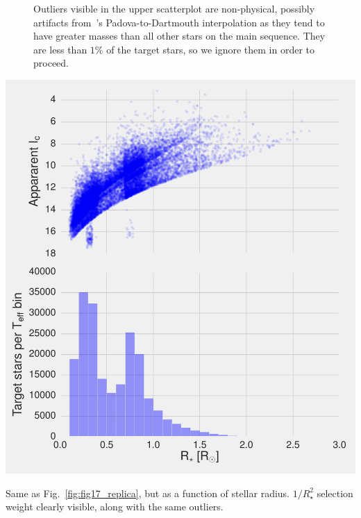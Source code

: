 \begin{figure}[!th]
{	Outliers visible in the upper scatterplot are non-physical, possibly artifacts from~'s Padova-to-Dartmouth interpolation as they tend to have greater masses than all other stars on the main sequence. They are less than $1\%$ of the target stars, so we ignore them in order to proceed.
	}
\end{figure}
\begin{marginfigure}[0in]
	\includegraphics{figures/fig17_radius_on_x.pdf}
	\label{fig:fig17_radius_on_x}
	\caption{Same as Fig.~\protect\ref{fig:fig17_replica}, but as a function of stellar radius. $1/R_\star^2$ selection weight clearly visible, along with the same outliers.
	}
\end{marginfigure}

